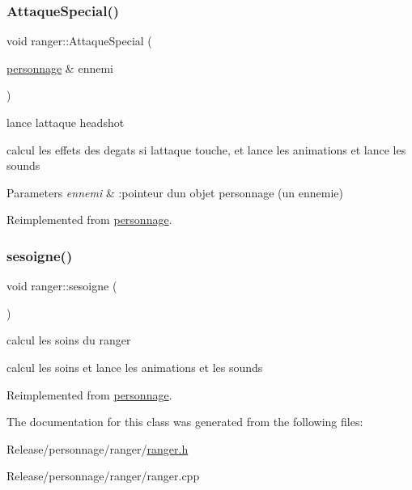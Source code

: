 \subsubsection{\texorpdfstring{Attaque\+Special()}{AttaqueSpecial()}}
{\footnotesize\ttfamily void ranger\+::\+Attaque\+Special (\begin{DoxyParamCaption}\item[{\mbox{\hyperlink{classpersonnage}{personnage}} \&}]{ennemi }\end{DoxyParamCaption})\hspace{0.3cm}{\ttfamily [virtual]}}



lance l\textquotesingle{}attaque headshot 

calcul les effets des degats si l\textquotesingle{}attaque touche, et lance les animations et lance les sounds


\begin{DoxyParams}{Parameters}
{\em ennemi} & \+:pointeur d\textquotesingle{}un objet personnage (un ennemie) \\
\hline
\end{DoxyParams}


Reimplemented from \mbox{\hyperlink{classpersonnage_ab8f27aff95ffc033fb22d56e549bd415}{personnage}}.

\mbox{\label{classranger_ae8e0c15c5f2698d8018c305a10da9ac5}} 
\subsubsection{\texorpdfstring{sesoigne()}{sesoigne()}}
{\footnotesize\ttfamily void ranger\+::sesoigne (\begin{DoxyParamCaption}{ }\end{DoxyParamCaption})\hspace{0.3cm}{\ttfamily [virtual]}}



calcul les soins du ranger 

calcul les soins et lance les animations et les sounds 

Reimplemented from \mbox{\hyperlink{classpersonnage_a53539db23cbf909d2c4b025ff2ac2e45}{personnage}}.



The documentation for this class was generated from the following files\+:\begin{DoxyCompactItemize}
\item 
Release/personnage/ranger/\mbox{\hyperlink{ranger_8h}{ranger.\+h}}\item 
Release/personnage/ranger/ranger.\+cpp\end{DoxyCompactItemize}
